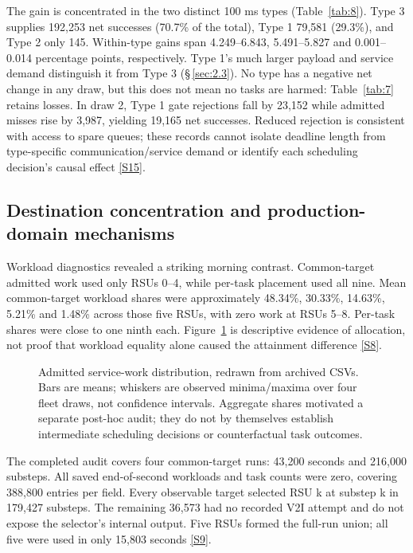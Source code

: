 \documentclass[11pt,a4paper]{article}
\begin{document}
The gain is concentrated in the two distinct 100 ms types (Table~\ref{tab:8}). Type 3 supplies 192,253 net successes (70.7\% of the total), Type 1 79,581 (29.3\%), and Type 2 only 145. Within-type gains span 4.249--6.843, 5.491--5.827 and 0.001--0.014 percentage points, respectively. Type 1's much larger payload and service demand distinguish it from Type 3 (\S\,\ref{sec:2.3}). No type has a negative net change in any draw, but this does not mean no tasks are harmed: Table~\ref{tab:7} retains losses. In draw 2, Type 1 gate rejections fall by 23,152 while admitted misses rise by 3,987, yielding 19,165 net successes. Reduced rejection is consistent with access to spare queues; these records cannot isolate deadline length from type-specific communication/service demand or identify each scheduling decision's causal effect \hyperref[source-s15]{[S15]}.

\subsection{Destination concentration and production-domain mechanisms}\label{sec:3.4}

Workload diagnostics revealed a striking morning contrast. Common-target admitted work used only RSUs 0--4, while per-task placement used all nine. Mean common-target workload shares were approximately 48.34\%, 30.33\%, 14.63\%, 5.21\% and 1.48\% across those five RSUs, with zero work at RSUs 5--8. Per-task shares were close to one ninth each. Figure~\ref{fig:5} is descriptive evidence of allocation, not proof that workload equality alone caused the attainment difference \hyperref[source-s8]{[S8]}.

\begin{figure}[htbp]
\centering

\caption{Admitted service-work distribution, redrawn from archived CSVs. Bars are means; whiskers are observed minima/maxima over four fleet draws, not confidence intervals. Aggregate shares motivated a separate post-hoc audit; they do not by themselves establish intermediate scheduling decisions or counterfactual task outcomes.}\label{fig:5}
\end{figure}

The completed audit covers four common-target runs: 43,200 seconds and 216,000 substeps. All saved end-of-second workloads and task counts were zero, covering 388,800 entries per field. Every observable target selected RSU k at substep k in 179,427 substeps. The remaining 36,573 had no recorded V2I attempt and do not expose the selector's internal output. Five RSUs formed the full-run union; all five were used in only 15,803 seconds \hyperref[source-s9]{[S9]}.
\end{document}
